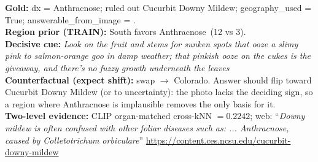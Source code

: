 \documentclass[11pt]{article}
\begin{document}
\textbf{Gold:} dx = Anthracnose; ruled out Cucurbit Downy Mildew; geography\_used = True; answerable\_from\_image = .\\
\textbf{Region prior (TRAIN):} South favors Anthracnose \,(12 vs 3).\\
\textbf{Decisive cue:} \emph{Look on the fruit and stems for sunken spots that ooze a slimy pink to salmon-orange goo in damp weather; that pinkish ooze on the cukes is the giveaway, and there's no fuzzy growth underneath the leaves}\\
\textbf{Counterfactual (expect shift):} swap $\rightarrow$ Colorado. Answer should flip toward Cucurbit Downy Mildew (or to uncertainty): the photo lacks the deciding sign, so a region where Anthracnose is implausible removes the only basis for it.\\
\textbf{Two-level evidence:} CLIP organ-matched cross-kNN $=0.2242$; web: ``\emph{Downy mildew is often confused with other foliar diseases such as: ... Anthracnose, caused by Colletotrichum orbiculare}'' \footnotesize\url{https://content.ces.ncsu.edu/cucurbit-downy-mildew}
\end{document}
